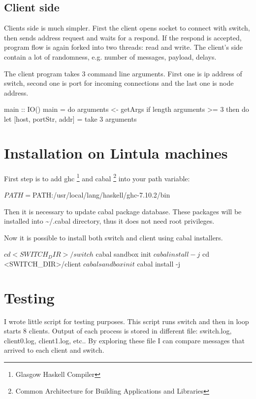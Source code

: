 \documentclass[11pt,a4paper,titlepage]{article}
\begin{document}
\subsection{Client side}

Clients side is much simpler. First the client opens socket to connect with switch, then sends address request and waits for a respond. If the respond is accepted, program flow is again forked into two threads: read and write. The client's side contain a lot of randomness, e.g. number of messages, payload, delays.

The client program takes 3 command line arguments. First one is ip address of switch, second one is port for incoming connections and the last one is node address.

\begin{haskellcode}
main :: IO()
main =  do
  arguments <- getArgs
  if length arguments >= 3
    then do
      let [host, portStr, addr] = take 3 arguments
\end{haskellcode}

\section{Installation on Lintula machines}

First step is to add ghc \footnote{Glasgow Haskell Compiler} and cabal \footnote{Common Architecture for Building Applications and Libraries} into your path variable:
\begin{bashcode}
$ PATH=$PATH:/usr/local/lang/haskell/ghc-7.10.2/bin
\end{bashcode}
Then it is necessary to update cabal package database. These packages will be installed into \textasciitilde/.cabal directory, thus it does not need root privileges. 
Now it is possible to install both switch and client using cabal installers.
\begin{bashcode}
$ cd <SWITCH_DIR>/switch
$ cabal sandbox init
$ cabal install -j
$ cd <SWITCH_DIR>/client
$ cabal sandbox init
$ cabal install -j
\end{bashcode}

\section{Testing}
I wrote little script for testing purposes. This script runs switch and then in loop starts 8 clients. Output of each process is stored in different file: switch.log, client0.log, client1.log, etc.. By exploring these file I can compare messages that arrived to each client and switch.
\end{document}
